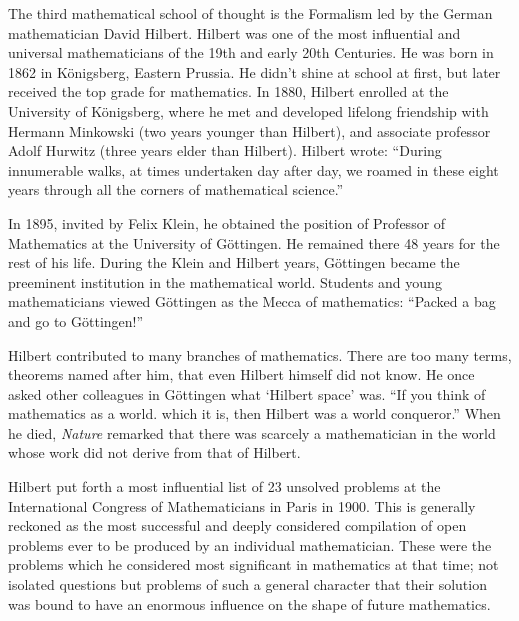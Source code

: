\documentclass{article}
\begin{document}
The third mathematical school of thought is the Formalism led by the German mathematician David Hilbert. Hilbert was one of the most influential and universal mathematicians of the 19th and early 20th Centuries. He was born in 1862 in Königsberg, Eastern Prussia. He didn't shine at school at first, but later received the top grade for mathematics. In 1880, Hilbert enrolled at the University of Königsberg, where he met and developed lifelong friendship with Hermann Minkowski (two years younger than Hilbert), and associate professor Adolf Hurwitz (three years elder than Hilbert). Hilbert wrote: ``During innumerable walks, at times undertaken day after day, we roamed in these eight years through all the corners of mathematical science.''

In 1895, invited by Felix Klein, he obtained the position of Professor of Mathematics at the University of Göttingen. He remained there 48 years for the rest of his life. During the Klein and Hilbert years, Göttingen became the preeminent institution in the mathematical world. Students and young mathematicians viewed Göttingen as the Mecca of mathematics: ``Packed a bag and go to Göttingen!''

Hilbert contributed to many branches of mathematics. There are too many terms, theorems named after him, that even Hilbert himself did not know. He once asked other colleagues in Göttingen what `Hilbert space' was. ``If you think of mathematics as a world. which it is, then Hilbert was a world conqueror.'' When he died, {\em Nature} remarked that there was scarcely a mathematician in the world whose work did not derive from that of Hilbert.\cite{Ried-1996}

Hilbert put forth a most influential list of 23 unsolved problems at the International Congress of Mathematicians in Paris in 1900. This is generally reckoned as the most successful and deeply considered compilation of open problems ever to be produced by an individual mathematician. These were the problems which he considered most significant in mathematics at that time; not isolated questions but problems of such a general character that their solution was bound to have an enormous influence on the shape of future mathematics.
\end{document}
